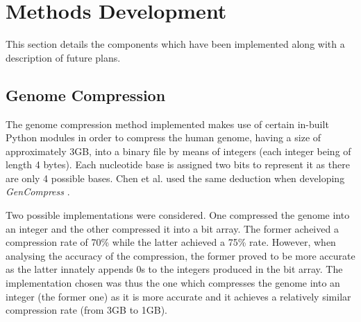 \documentclass{csfyp}
\begin{document}
\section{Methods Development}\vspace{-2ex}

This section details the components which have been implemented along with a description of future plans.

\subsection{Genome Compression}\vspace{-2ex}
The genome compression method implemented makes use of certain in-built Python modules in order to compress the human genome, having a size of approximately 3GB, into a binary file by means of integers (each integer being of length 4 bytes).  Each nucleotide base is assigned two bits to represent it as there are only 4 possible bases. Chen et al. used the same deduction when developing {\textit{GenCompress}} \cite{gencompress}.  

Two possible implementations were considered.  One compressed the genome into an integer and the other compressed it into a bit array.  The former acheived a compression rate of 70\% while the latter achieved a 75\% rate.  However, when analysing the accuracy of the compression, the former proved to be more accurate as the latter innately appends 0s to the integers produced in the bit array.  The implementation chosen was thus the one which compresses the genome into an integer (the former one) as it is more accurate and it achieves a relatively similar compression rate (from 3GB to 1GB).  
\end{document}
